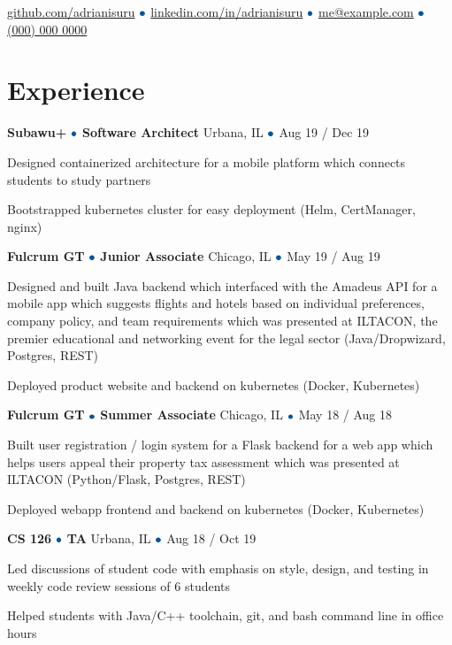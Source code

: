 \documentclass[hidelinks,11pt]{extarticle}
\let\boringbullet\bullet
\renewcommand{\bullet}{\color{mycolor}{\boringbullet}}
\newcommand{\position}[5]{
    {\textbf{#1}} $\bullet$ {\textbf{#2}}
	\hfill{\small#4 $\bullet$ #3}
    \begin{citemize}
        #5
    \end{citemize}
}
\begin{document}
\flushleft
{\Huge\bfseries{\color{mycolor}{Adrian Herath}}}

{\small
\href{https://github.com/adrianisuru/}{github.com/adrianisuru}
$\bullet$ %
\href{https://www.linkedin.com/in/adrianisuru/}{linkedin.com/in/adrianisuru}
$\bullet$ %
\href{mailto:me@example.com}{me@example.com} %
$\bullet$ %
\href{tel:+1000-000-0000}{(000) 000 0000} %
}
\section{Experience}

\position
{Subawu+}
{Software Architect}
{Aug 19 {\color{mycolor}/} Dec 19}
{Urbana, IL}
{
\item Designed containerized architecture for a mobile platform which connects 
    students to study partners
\item Bootstrapped kubernetes cluster for easy deployment (Helm, CertManager, nginx)
}

\position
{Fulcrum GT}
{Junior Associate}
{May 19 {\color{mycolor}/} Aug 19}
{Chicago, IL}
{
    \item Designed and built Java backend which interfaced with 
            the Amadeus API 
    for a mobile app which suggests
        flights and hotels based on individual preferences, company policy,
        and team requirements 
    which was presented at ILTACON, the premier educational and networking 
        event for the legal sector (Java/Dropwizard, Postgres, REST)
    \item Deployed product website and backend on kubernetes (Docker, Kubernetes)
}

\position
{Fulcrum GT}
{Summer Associate}
{May 18 {\color{mycolor}/} Aug 18}
{Chicago, IL}
{
    \item Built user registration / login system for a Flask backend 
    for a web app which helps users appeal their property tax assessment 
    which was presented at ILTACON (Python/Flask, Postgres, REST)
    \item Deployed webapp frontend and backend on kubernetes (Docker, Kubernetes)
}

\position
{CS 126}
{TA}
{Aug 18 {\color{mycolor}/} Oct 19}
{Urbana, IL}
{
    \item Led discussions of student code with emphasis on style, design, and
        testing in weekly code review sessions of 6 students
    \item Helped students with Java/C++ toolchain, git, and bash command line in
        office hours
}
\end{document}
